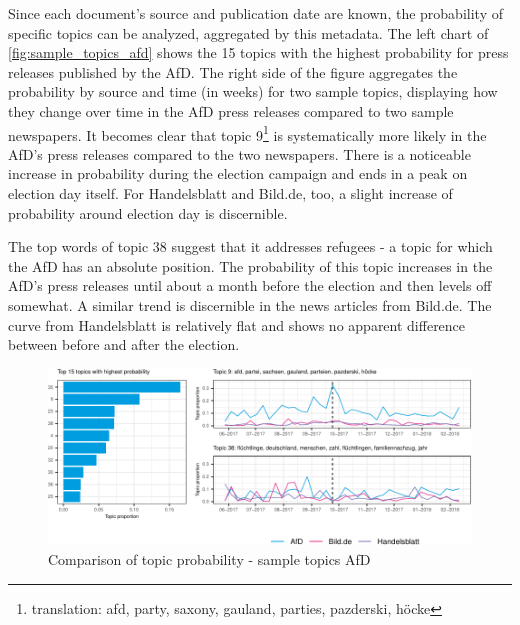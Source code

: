 \documentclass[
  12pt,
]{article}
\begin{document}
Since each document's source and publication date are known, the
probability of specific topics can be analyzed, aggregated by this
metadata. The left chart of \autoref{fig:sample_topics_afd} shows the 15
topics with the highest probability for press releases published by the
AfD. The right side of the figure aggregates the probability by source
and time (in weeks) for two sample topics, displaying how they change
over time in the AfD press releases compared to two sample newspapers.
It becomes clear that topic 9\footnote{translation: afd, party, saxony,
  gauland, parties, pazderski, höcke} is systematically more likely in
the AfD's press releases compared to the two newspapers. There is a
noticeable increase in probability during the election campaign and ends
in a peak on election day itself. For Handelsblatt and Bild.de, too, a
slight increase of probability around election day is discernible.

The top words of topic 38 suggest that it addresses refugees - a topic
for which the AfD has an absolute position. The probability of this
topic increases in the AfD's press releases until about a month before
the election and then levels off somewhat. A similar trend is
discernible in the news articles from Bild.de. The curve from
Handelsblatt is relatively flat and shows no apparent difference between
before and after the election.

\begin{figure}

{\centering \includegraphics[width=1\linewidth]{main_text_files/figure-latex/Top AfD topics-1} 

}

\caption{Comparison of topic probability - sample topics AfD \label{fig:sample_topics_afd}}\label{fig:Top AfD topics}
\end{figure}
\end{document}
